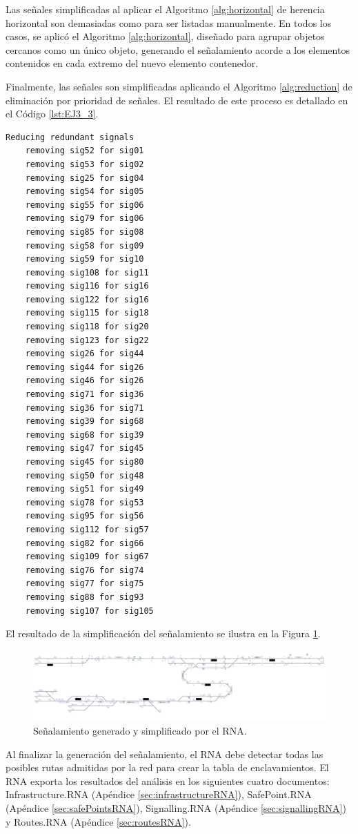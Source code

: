 	Las señales simplificadas al aplicar el Algoritmo \ref{alg:horizontal} de herencia horizontal son demasiadas como para ser listadas manualmente. En todos los casos, se aplicó el Algoritmo \ref{alg:horizontal}, diseñado para agrupar objetos cercanos como un único objeto, generando el señalamiento acorde a los elementos contenidos en cada extremo del nuevo elemento contenedor.
	
	Finalmente, las señales son simplificadas aplicando el Algoritmo \ref{alg:reduction} de eliminación por prioridad de señales. El resultado de este proceso es detallado en el Código \ref{lst:EJ3_3}.
	
	\begin{lstlisting}[language = {}, tabsize=4, basicstyle=\footnotesize\ttfamily, showspaces=false, showstringspaces=false, caption = Reducción de señalamiento por prioridad de señales, label = {lst:EJ3_3}]
	Reducing redundant signals
	removing sig52 for sig01
	removing sig53 for sig02
	removing sig25 for sig04
	removing sig54 for sig05
	removing sig55 for sig06
	removing sig79 for sig06
	removing sig85 for sig08
	removing sig58 for sig09
	removing sig59 for sig10
	removing sig108 for sig11
	removing sig116 for sig16
	removing sig122 for sig16
	removing sig115 for sig18
	removing sig118 for sig20
	removing sig123 for sig22
	removing sig26 for sig44
	removing sig44 for sig26
	removing sig46 for sig26
	removing sig71 for sig36
	removing sig36 for sig71
	removing sig39 for sig68
	removing sig68 for sig39
	removing sig47 for sig45
	removing sig45 for sig80
	removing sig50 for sig48
	removing sig51 for sig49
	removing sig78 for sig53
	removing sig95 for sig56
	removing sig112 for sig57
	removing sig82 for sig66
	removing sig109 for sig67
	removing sig76 for sig74
	removing sig77 for sig75
	removing sig88 for sig93
	removing sig107 for sig105
	\end{lstlisting}
	
	El resultado de la simplificación del señalamiento se ilustra en la Figura \ref{fig:EJ3_7}.
	
	\begin{figure}[H]
		\centering
		\includegraphics[width=1\textwidth]{resultados-obtenidos/ejemplo3/images/3_RNA.png}
		\centering\caption{Señalamiento generado y simplificado por el RNA.}
		\label{fig:EJ3_7}
	\end{figure}
	
	Al finalizar la generación del señalamiento, el RNA debe detectar todas las posibles rutas admitidas por la red para crear la tabla de enclavamientos. El RNA exporta los resultados del análisis en los siguientes cuatro documentos: Infrastructure.RNA (Apéndice \ref{sec:infrastructureRNA}), SafePoint.RNA (Apéndice \ref{sec:safePointsRNA}), Signalling.RNA (Apéndice \ref{sec:signallingRNA}) y Routes.RNA (Apéndice \ref{sec:routesRNA}).
